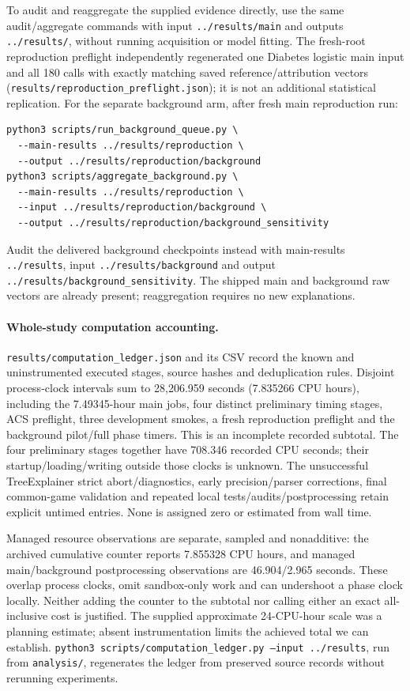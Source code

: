 To audit and reaggregate the supplied evidence directly, use the same audit/aggregate commands with input \texttt{../results/main} and outputs \texttt{../results/}, without running acquisition or model fitting. The fresh-root reproduction preflight independently regenerated one Diabetes logistic main input and all 180 calls with exactly matching saved reference/attribution vectors (\texttt{results/reproduction\_preflight.json}); it is not an additional statistical replication. For the separate background arm, after fresh main reproduction run:
\begin{verbatim}
python3 scripts/run_background_queue.py \
  --main-results ../results/reproduction \
  --output ../results/reproduction/background
python3 scripts/aggregate_background.py \
  --main-results ../results/reproduction \
  --input ../results/reproduction/background \
  --output ../results/reproduction/background_sensitivity
\end{verbatim}
Audit the delivered background checkpoints instead with main-results \texttt{../results}, input \texttt{../results/background} and output \texttt{../results/background\_sensitivity}. The shipped main and background raw vectors are already present; reaggregation requires no new explanations.

\paragraph{Whole-study computation accounting.}
\texttt{results/computation\_ledger.json} and its CSV record the known and uninstrumented executed stages, source hashes and deduplication rules. Disjoint process-clock intervals sum to 28,206.959 seconds (7.835266 CPU hours), including the 7.49345-hour main jobs, four distinct preliminary timing stages, ACS preflight, three development smokes, a fresh reproduction preflight and the background pilot/full phase timers. This is an incomplete recorded subtotal. The four preliminary stages together have 708.346 recorded CPU seconds; their startup/loading/writing outside those clocks is unknown. The unsuccessful TreeExplainer strict abort/diagnostics, early precision/parser corrections, final common-game validation and repeated local tests/audits/postprocessing retain explicit untimed entries. None is assigned zero or estimated from wall time.

Managed resource observations are separate, sampled and nonadditive: the archived cumulative counter reports 7.855328 CPU hours, and managed main/background postprocessing observations are 46.904/2.965 seconds. These overlap process clocks, omit sandbox-only work and can undershoot a phase clock locally. Neither adding the counter to the subtotal nor calling either an exact all-inclusive cost is justified. The supplied approximate 24-CPU-hour scale was a planning estimate; absent instrumentation limits the achieved total we can establish. \texttt{python3 scripts/computation\_ledger.py --input ../results}, run from \texttt{analysis/}, regenerates the ledger from preserved source records without rerunning experiments.

